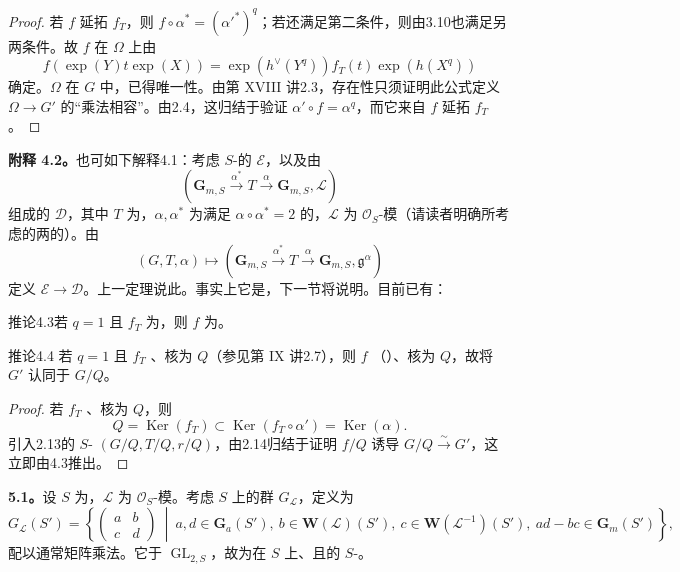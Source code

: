\begin{proof}
若 $f$ 延拓 $f_T$，则 $f\circ\alpha^*=(\alpha'^*)^q$；若还满足第二条件，则由3.10也满足另两条件。故 $f$ 在 $\Omega$ 上由
\[f(\exp(Y)t\exp(X))=\exp(h^\vee(Y^q))f_T(t)\exp(h(X^q))\]
确定。$\Omega$ 在 $G$ 中，已得唯一性。由第 XVIII 讲2.3，存在性只须证明此公式定义 $\Omega\to G'$ 的“乘法相容”。由2.4，这归结于验证 $\alpha'\circ f=\alpha^q$，而它来自 $f$ 延拓 $f_T$。
\end{proof}
\textbf{附释 4.2。}也可如下解释4.1：考虑 $S$-的 $\mathscr E$，以及由
\[(\mathbf G_{m,S}\xrightarrow{\alpha^*}T\xrightarrow\alpha\mathbf G_{m,S},\mathscr L)\]
组成的 $\mathscr D$，其中 $T$ 为，$\alpha,\alpha^*$ 为满足 $\alpha\circ\alpha^*=2$ 的，$\mathscr L$ 为 $\mathscr O_S$-模（请读者明确所考虑的两的）。由
\[(G,T,\alpha)\longmapsto(\mathbf G_{m,S}\xrightarrow{\alpha^*}T\xrightarrow\alpha\mathbf G_{m,S},\mathfrak g^\alpha)\]
定义 $\mathscr E\to\mathscr D$。上一定理说此。事实上它是，下一节将说明。目前已有：
\begin{SGAresult}{推论}{4.3}若 $q=1$ 且 $f_T$ 为，则 $f$ 为。\end{SGAresult}
\begin{SGAresult}{推论}{4.4}
若 $q=1$ 且 $f_T$ 、核为 $Q$（参见第 IX 讲2.7），则 $f$ （）、核为 $Q$，故将 $G'$ 认同于 $G/Q$。
\end{SGAresult}
\begin{proof}
若 $f_T$ 、核为 $Q$，则
\[Q=\operatorname{Ker}(f_T)\subset\operatorname{Ker}(f_T\circ\alpha')=\operatorname{Ker}(\alpha).\]
引入2.13的 $S$- $(G/Q,T/Q,r/Q)$，由2.14归结于证明 $f/Q$ 诱导 $G/Q\xrightarrow\sim G'$，这立即由4.3推出。
\end{proof}
\textbf{5.1。}设 $S$ 为，$\mathscr L$ 为 $\mathscr O_S$-模。考虑 $S$ 上的群 $G_{\mathscr L}$，定义为
\[G_{\mathscr L}(S')=\left\{\begin{pmatrix}a&b\\c&d\end{pmatrix}\ \middle|\ a,d\in\mathbf G_a(S'),\ b\in\mathbf W(\mathscr L)(S'),\ c\in\mathbf W(\mathscr L^{-1})(S'),\ ad-bc\in\mathbf G_m(S')\right\},\]
配以通常矩阵乘法。它于 $\operatorname{GL}_{2,S}$，故为在 $S$ 上、且的 $S$-。

